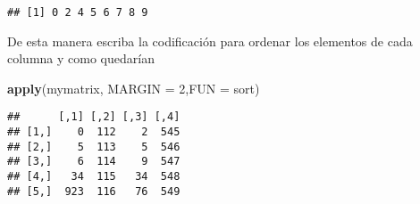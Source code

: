 \documentclass[]{article}
\newenvironment{Shaded}{\begin{snugshade}}{\end{snugshade}}
\newcommand{\KeywordTok}[1]{\textcolor[rgb]{0.13,0.29,0.53}{\textbf{#1}}}
\newcommand{\DataTypeTok}[1]{\textcolor[rgb]{0.13,0.29,0.53}{#1}}
\newcommand{\DecValTok}[1]{\textcolor[rgb]{0.00,0.00,0.81}{#1}}
\newcommand{\NormalTok}[1]{#1}
\begin{document}
\begin{verbatim}
## [1] 0 2 4 5 6 7 8 9
\end{verbatim}

De esta manera escriba la codificación para ordenar los elementos de
cada columna y como quedarían

\begin{Shaded}
\begin{Highlighting}[]
\KeywordTok{apply}\NormalTok{(mymatrix, }\DataTypeTok{MARGIN =} \DecValTok{2}\NormalTok{,}\DataTypeTok{FUN =}\NormalTok{ sort)}
\end{Highlighting}
\end{Shaded}

\begin{verbatim}
##      [,1] [,2] [,3] [,4]
## [1,]    0  112    2  545
## [2,]    5  113    5  546
## [3,]    6  114    9  547
## [4,]   34  115   34  548
## [5,]  923  116   76  549
\end{verbatim}
\end{document}
